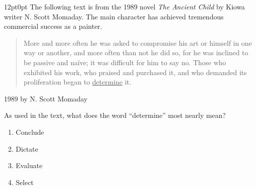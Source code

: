 \documentclass[11pt, twocolumn]{article}
\newcounter{questionnum}
\begin{document}
\vspace{6pt}\noindent
\begin{minipage}{\columnwidth}\raggedright
\noindent{}\par\vspace{8pt}
\begin{adjustwidth}{12pt}{0pt}
The following text is from the 1989 novel \textit{The Ancient Child} by Kiowa writer N. Scott Momaday. The main character has achieved tremendous commercial success as a painter.

\vspace{6pt}
\begin{quote}

More and more often he was asked to compromise his art or himself in one way or another, and more often than not he did so, for he was inclined to be passive and naïve; it was difficult for him to say no. Those who exhibited his work, who praised and purchased it, and who demanded its proliferation began to \uline{determine} it.

\end{quote}

\textcopyright{}1989 by N. Scott Momaday
\vspace{6pt}

As used in the text, what does the word ``determine'' most nearly mean?
\begin{enumerate}[label=\Alph*),leftmargin=18pt,topsep=3pt,itemsep=2pt]
  \item Conclude
  \item Dictate
  \item Evaluate
  \item Select
\end{enumerate}
\end{adjustwidth}
\end{minipage}\par
\end{document}
